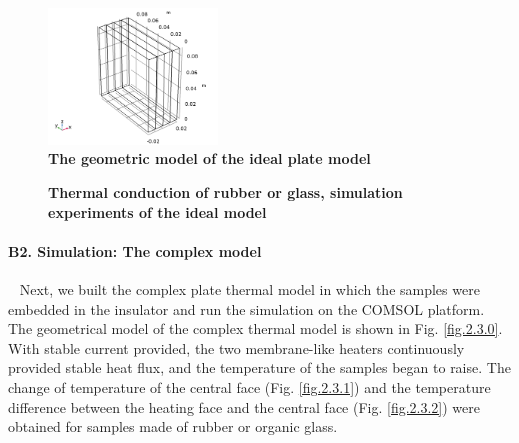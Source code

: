 \documentclass[10pt,a4paper,twocolumn,twoside,UTF8]{article}
\begin{document}
	\begin{figure}[htbp]
		\centering
		\includegraphics[width=0.4\textwidth]{attachments/fig.2.2.0.png}
		\caption{\textbf{The geometric model of the ideal plate model}}
		\label{fig.2.2.0}
	\end{figure}

	\begin{figure}[htbp]
		\centering
		\caption{\textbf{Thermal conduction of rubber or glass, simulation experiments of the ideal model}}
		\label{fig.2.2}
	\end{figure}


	\paragraph{B2. Simulation: The complex model}~
	\newline 
	\indent
	Next, we built the complex plate thermal model in which the samples were embedded in the insulator and run the simulation on the COMSOL platform.
	The geometrical model of the complex thermal model is shown in Fig. \ref{fig.2.3.0}.
	With stable current provided, the two membrane-like heaters continuously provided stable heat flux, and the temperature of the samples began to raise. 
	The change of temperature of the central face (Fig. \ref{fig.2.3.1}) and the temperature difference between the heating face and the central face (Fig. \ref{fig.2.3.2}) were obtained for samples made of rubber or organic glass.
\end{document}
